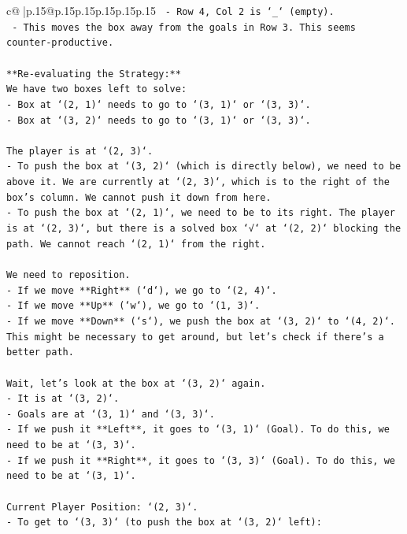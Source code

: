 \documentclass{article}
\begin{document}
{\begin{supertabular}{c@{$\;$}|p{.15\linewidth}@{}p{.15\linewidth}p{.15\linewidth}p{.15\linewidth}p{.15\linewidth}p{.15\linewidth}}
{{{\texttt{   {-} Row 4, Col 2 is `\_` (empty).} \\
\texttt{   {-} This moves the box away from the goals in Row 3. This seems counter{-}productive.} \\
\\ 
\texttt{**Re{-}evaluating the Strategy:**} \\
\texttt{We have two boxes left to solve:} \\
\texttt{{-} Box at `(2, 1)` needs to go to `(3, 1)` or `(3, 3)`.} \\
\texttt{{-} Box at `(3, 2)` needs to go to `(3, 1)` or `(3, 3)`.} \\
\\ 
\texttt{The player is at `(2, 3)`.} \\
\texttt{{-} To push the box at `(3, 2)` (which is directly below), we need to be above it. We are currently at `(2, 3)`, which is to the right of the box's column. We cannot push it down from here.} \\
\texttt{{-} To push the box at `(2, 1)`, we need to be to its right. The player is at `(2, 3)`, but there is a solved box `√` at `(2, 2)` blocking the path. We cannot reach `(2, 1)` from the right.} \\
\\ 
\texttt{We need to reposition.} \\
\texttt{{-} If we move **Right** (`d`), we go to `(2, 4)`.} \\
\texttt{{-} If we move **Up** (`w`), we go to `(1, 3)`.} \\
\texttt{{-} If we move **Down** (`s`), we push the box at `(3, 2)` to `(4, 2)`. This might be necessary to get around, but let's check if there's a better path.} \\
\\ 
\texttt{Wait, let's look at the box at `(3, 2)` again.} \\
\texttt{{-} It is at `(3, 2)`.} \\
\texttt{{-} Goals are at `(3, 1)` and `(3, 3)`.} \\
\texttt{{-} If we push it **Left**, it goes to `(3, 1)` (Goal). To do this, we need to be at `(3, 3)`.} \\
\texttt{{-} If we push it **Right**, it goes to `(3, 3)` (Goal). To do this, we need to be at `(3, 1)`.} \\
\\ 
\texttt{Current Player Position: `(2, 3)`.} \\
\texttt{{-} To get to `(3, 3)` (to push the box at `(3, 2)` left):} \\
}}}
\end{supertabular}}
\end{document}
